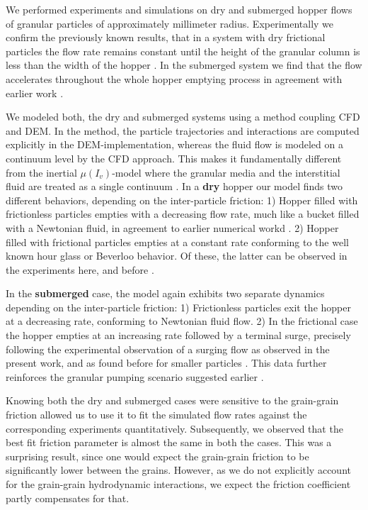 \documentclass[twoside,twocolumn,9pt]{article}
\begin{document}
We performed experiments and simulations on dry and submerged hopper 
flows of granular particles of approximately millimeter radius.
Experimentally we confirm the previously known results, that in a system with dry frictional particles 
the flow rate remains constant until the height of the granular column is less than the
width of the hopper \cite{Nedderman1982}.
In the submerged system we find that the flow accelerates throughout the whole hopper emptying
process in agreement with earlier work \cite{koivistoSubmitted}.

We modeled both, the dry and submerged systems using a method coupling CFD and DEM.
In the method, the particle trajectories and 
interactions are computed explicitly in the DEM-implementation, whereas the 
fluid flow is modeled on a continuum level by the CFD approach. This makes it
fundamentally different from the inertial $\mu(I_v)$-model where the 
granular media and the interstitial fluid are treated as a single 
continuum \cite{Boyer11PRL}.
In a {\bf dry} hopper our model finds two different behaviors, depending on the
inter-particle friction: 1) Hopper filled with frictionless particles empties
with a decreasing flow rate, much like a bucket filled with a Newtonian fluid, in agreement to earlier
numerical workd \cite{Langston1994}. 2) Hopper filled
with frictional particles empties at a constant rate conforming to the well known hour glass
or Beverloo behavior. Of these, the latter can be observed in the experiments here, and before \cite{Nedderman1982}.

In the {\bf submerged} case, the model again exhibits two separate dynamics depending on the
inter-particle friction: 1) Frictionless particles exit the hopper at a decreasing rate,
conforming to Newtonian fluid flow. 2) In the frictional case the hopper empties at an increasing
rate followed by a terminal surge, precisely following the experimental observation of a surging flow as
observed in the present work, and as found before for smaller particles \cite{koivistoSubmitted}. 
This data further reinforces the granular pumping scenario suggested earlier \cite{koivistoSubmitted}.

Knowing both the dry and submerged cases were sensitive to the grain-grain friction
allowed us to use it to fit the simulated flow rates against the corresponding 
{experiments quantitatively. Subsequently, we observed that the best fit friction parameter is almost}
the same in both the cases. This was a surprising result, since one would expect the grain-grain
{friction to be significantly lower between the grains. However, as we do not explicitly account
for the grain-grain hydrodynamic interactions, we expect the
friction coefficient partly compensates for that.}
\end{document}
